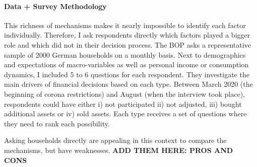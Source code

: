 \documentclass[ProjectABM]{subfiles}
\begin{document}








\paragraph{Data + Survey Methodology}
This richness of mechanisms makes it nearly impossible to identify each factor individually. Therefore, I ask respondents directly which factors played a bigger role and which did not in their decision process. The BOP asks a representative sample of 2000 German households on a monthly basis. Next to demographics and expectations of macro-variables as well as personal income or consumption dynamics, I included 5 to 6 questions for each respondent. They investigate the main drivers of financial decisions based on each type. Between March 2020 (the beginning of corona restrictions) and August (when the interview took place), respondents could have either i) not participated ii) not adjusted, iii) bought additional assets or iv) sold assets. Each type receives a set of questions where they need to rank each possibility.

Asking households directly are appealing in this context to compare the mechanisms, but have weaknesses. \textbf{ADD THEM HERE: PROS AND CONS}
\end{document}
